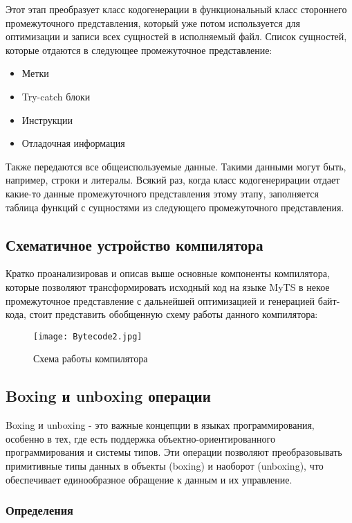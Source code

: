Этот этап преобразует класс кодогенерации в функциональный класс стороннего промежуточного представления, который уже
потом используется для оптимизации и записи всех сущностей в исполняемый файл.
Список сущностей, которые отдаются в следующее промежуточное представление:

\begin{itemize}[left=2em]
    \item Метки
    \item Try-catch блоки
    \item Инструкции
    \item Отладочная информация
\end{itemize}

Также передаются все общеиспользуемые данные.
Такими данными могут быть, например, строки и литералы.
Всякий раз, когда класс кодогенерирации отдает какие-то данные промежуточного представления этому этапу,
заполняется таблица функций с сущностями из следующего промежуточного представления.

\subsection{Схематичное устройство компилятора}

Кратко проанализировав и описав выше основные компоненты компилятора, которые позволяют трансформировать исходный код на
языке MyTS в некое промежуточное представление с дальнейшей оптимизацией и генерацией байт-кода,
стоит представить обобщенную схему работы данного компилятора:

\begin{figure}[h]
    \centering
    \texttt{[image: Bytecode2.jpg]}
    \caption{Схема работы компилятора}\label{fig:figure}
\end{figure}

\subsection{Boxing и unboxing операции}

Boxing и unboxing - это важные концепции в языках программирования, особенно в тех, где есть поддержка
объектно-ориентированного программирования и системы типов.
Эти операции позволяют преобразовывать примитивные типы данных в объекты (boxing) и наоборот (unboxing), что
обеспечивает единообразное обращение к данным и их управление.

\subsubsection{Определения}

